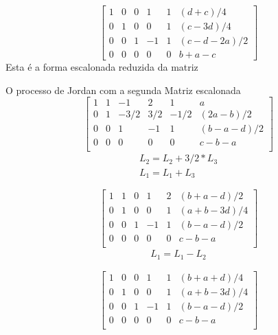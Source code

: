\documentclass{beamer}
\begin{document}
\begin{frame}{}
  $$
  \left[ \begin{array}{ccccc|c}
     1 & 0 & 0 & 1 & 1 & (d+c)/4 \\ 
     0 & 1 & 0 & 0 & 1 & (c-3d)/4\\
    0 & 0 & 1 & -1 & 1 & (c -d-2a)/2 \\
     0 & 0 & 0 &0 & 0 & b +a -c 
  \end{array}\right]$$
  Esta é a forma escalonada reduzida da matriz
\end{frame}

\begin{frame}{O processo de Jordan com a segunda Matriz escalonada}
  $$
  \left[ \begin{array}{ccccc|c}
    {1} & 1 & -1 & 2 & 1 & a \\ 
     0 & {1} & -3/2 &3/2 & -1/2 & (2a-b)/2 \\
     0 & 0 & {1} & -1 & 1 & (b - a -d)/2 \\
     0 & 0 & 0 & 0 & 0 & c-b-a \\
    \end{array}\right]
  $$
\begin{gather*}
  L_2 =L_2 + 3/2*L_3 \\
  L_1 =L_1 + L_3
\end{gather*}

\end{frame}


\begin{frame}
  $$
  \left[ \begin{array}{ccccc|c}
    {1} & 1 & 0 & 1 & 2 & (b+a-d)/2 \\ 
     0 & {1} & 0 &0 & 1 & (a+b-3d)/4 \\
     0 & 0 & {1} & -1 & 1 & (b - a -d)/2 \\
     0 & 0 & 0 & 0 & 0 & c-b-a \\
    \end{array}\right]
  $$
\begin{gather*}
  L_1 =L_1 - L_2
\end{gather*}

\end{frame}


\begin{frame}
  $$
  \left[ \begin{array}{ccccc|c}
     1 & 0 & 0 & 1 & 1 & (b+a +d)/4 \\ 
     0 & 1 & 0 &0 & 1 & (a+b-3d)/4 \\
     0 & 0 & 1 & -1 & 1 & (b - a -d)/2 \\
     0 & 0 & 0 & 0 & 0 & c-b-a \\
    \end{array}\right]
  $$

\end{frame}
\end{document}
